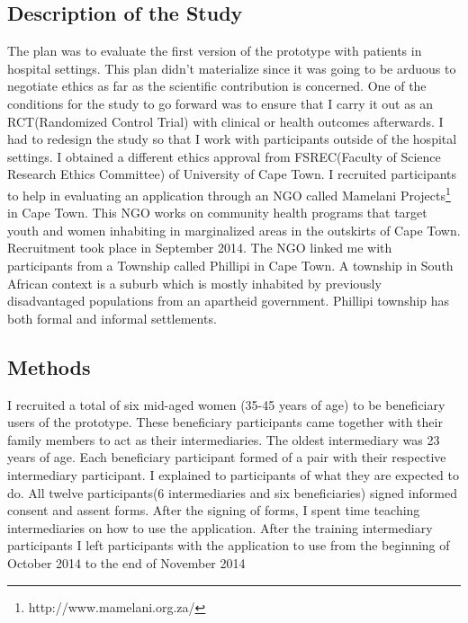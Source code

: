 \subsection{Description of the Study}
The plan was to evaluate the first version of the prototype with patients in  hospital settings. This plan didn't materialize since it was going to be arduous to negotiate ethics as far as the scientific contribution is concerned. One of the conditions for the study to go forward was to ensure that I carry it out as an RCT(Randomized Control Trial) with clinical or health outcomes afterwards. I had to redesign the study so that I work with participants outside of the hospital settings. I obtained a different ethics approval from FSREC(Faculty of Science Research Ethics Committee) of University of Cape Town.\newline
I recruited participants to help in evaluating an application through an NGO called Mamelani Projects\footnote{http://www.mamelani.org.za/} in Cape Town. This NGO works on  community health programs that target youth and women inhabiting in marginalized areas in the outskirts of Cape Town. Recruitment took place in September 2014. The NGO linked me with participants from a Township called Phillipi in Cape Town. A township in South African context is a suburb which is mostly inhabited by previously disadvantaged populations from an apartheid government. Phillipi township has both formal and informal settlements.  
\subsection{Methods}
 I recruited a total of six mid-aged women (35-45 years of age) to be beneficiary users of the prototype. These beneficiary participants came together with their family members to act as their intermediaries. The oldest intermediary was 23 years of age. Each beneficiary participant formed of a pair with their respective intermediary participant. I explained to participants of what they are expected to do. All twelve participants(6 intermediaries and six beneficiaries) signed informed consent and assent forms. After the signing of forms, I spent time teaching intermediaries on how to use the application. After the training intermediary participants I left participants with the application to use from the beginning of October 2014 to the end of November 2014  

